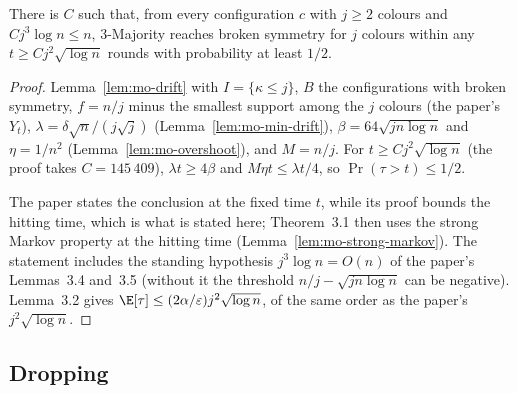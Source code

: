 \begin{lemma}\label{lem:mo-breaking}
\leanok
{}
There is $C$ such that, from every configuration $c$ with $j\ge2$ colours and $Cj^3\log n\le n$,
3-Majority reaches broken symmetry for $j$ colours within any $t\ge Cj^2\sqrt{\log n}$ rounds with
probability at least $1/2$.
\end{lemma}
\begin{proof}\leanok
Lemma~\ref{lem:mo-drift} with $I=\{\kappa\le j\}$, $B$ the configurations with broken symmetry,
$f=n/j$ minus the smallest support among the $j$ colours (the paper's $Y_t$),
$\lambda=\delta\sqrt n/(j\sqrt j)$ (Lemma~\ref{lem:mo-min-drift}), $\beta=64\sqrt{jn\log n}$ and
$\eta=1/n^2$ (Lemma~\ref{lem:mo-overshoot}), and $M=n/j$. For $t\ge Cj^2\sqrt{\log n}$ (the proof
takes $C=145\,409$), $\lambda t\ge4\beta$ and $M\eta t\le\lambda t/4$, so $\Pr(\tau>t)\le1/2$.

The paper states the conclusion at the fixed time $t$, while its proof bounds the hitting time,
which is what is stated here; Theorem~3.1 then uses the strong Markov property at the hitting time
(Lemma~\ref{lem:mo-strong-markov}). The statement includes the standing hypothesis
$j^3\log n=O(n)$ of the paper's Lemmas~3.4 and~3.5 (without it the threshold
$n/j-\sqrt{jn\log n}$ can be negative). Lemma~3.2 gives
$\E[\tau]\le(2\alpha/\varepsilon)j^2\sqrt{\log n}$, of the same order as the paper's
$j^2\sqrt{\log n}$.
\end{proof}

\subsection{Dropping}

